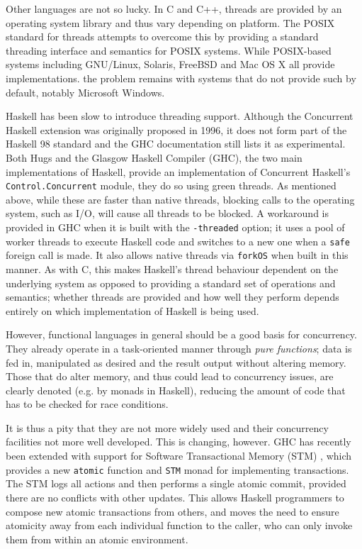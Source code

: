 Other languages are not so lucky.  In C and C++, threads are provided
by an operating system library and thus vary depending on platform.
The POSIX standard for threads attempts to overcome this by providing
a standard threading interface and semantics for POSIX systems.  While
POSIX-based systems including GNU/Linux, Solaris, FreeBSD and Mac OS X
all provide implementations. the problem remains with systems that do
not provide such by default, notably Microsoft Windows.

Haskell has been slow to introduce threading support.  Although the
Concurrent Haskell \cite{conchaskell} extension was originally
proposed in 1996, it does not form part of the Haskell 98 standard and
the GHC documentation still lists it as experimental.  Both Hugs and
the Glasgow Haskell Compiler (GHC), the two main implementations of
Haskell, provide an implementation of Concurrent Haskell's
\texttt{Control.Concurrent} module, they do so using green threads.
As mentioned above, while these are faster than native threads,
blocking calls to the operating system, such as I/O, will cause all
threads to be blocked.  A workaround is provided in GHC when it is
built with the \texttt{-threaded} option; it uses a pool of worker
threads to execute Haskell code and switches to a new one when a
\texttt{safe} foreign call is made.  It also allows native threads via
\texttt{forkOS} when built in this manner.  As with C, this makes
Haskell's thread behaviour dependent on the underlying system as
opposed to providing a standard set of operations and semantics;
whether threads are provided and how well they perform depends
entirely on which implementation of Haskell is being used.

However, functional languages in general should be a good basis for
concurrency.  They already operate in a task-oriented manner through
\emph{pure functions}; data is fed in, manipulated as desired and the
result output without altering memory.  Those that do alter memory,
and thus could lead to concurrency issues, are clearly denoted
(e.g. by monads in Haskell), reducing the amount of code that has to
be checked for race conditions.

It is thus a pity that they are not more widely used and their
concurrency facilities not more well developed.  This is changing,
however.  GHC has recently been extended with support for Software
Transactional Memory (STM) \cite{haskellstm}, which provides a new
\texttt{atomic} function and \texttt{STM} monad for implementing
transactions.  The STM logs all actions and then performs a single
atomic commit, provided there are no conflicts with other updates.
This allows Haskell programmers to compose new atomic transactions
from others, and moves the need to ensure atomicity away from each
individual function to the caller, who can only invoke them from
within an atomic environment.

